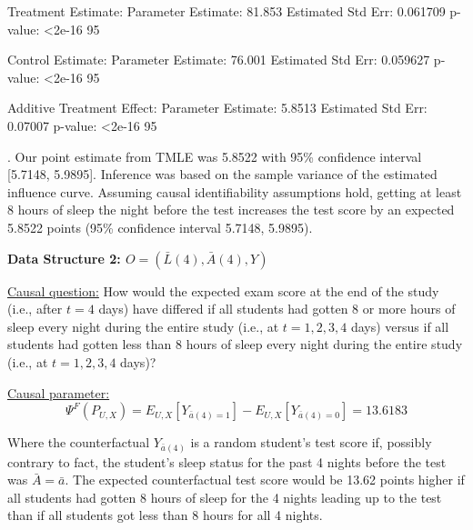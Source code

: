 \documentclass[answers]{exam}
\begin{document}
\begin{solution}
\begin{Schunk}
\begin{Soutput}
Treatment Estimate:
   Parameter Estimate:  81.853 
    Estimated Std Err:  0.061709 
              p-value:  <2e-16 
    95%

Control Estimate:
   Parameter Estimate:  76.001 
    Estimated Std Err:  0.059627 
              p-value:  <2e-16 
    95%

Additive Treatment Effect:
   Parameter Estimate:  5.8513 
    Estimated Std Err:  0.07007 
              p-value:  <2e-16 
    95%
\end{Soutput}
\end{Schunk}

. Our point estimate from TMLE was 5.8522 with 95\% confidence interval [5.7148, 5.9895]. Inference was based on the sample variance of the estimated influence curve. Assuming causal identifiability assumptions hold, getting at least 8 hours of sleep the night before the test increases the test score by an expected 5.8522 points (95\% confidence interval 5.7148, 5.9895).


\end{solution}


\noindent\large\textbf{Data Structure 2: $O = (\bar{L}(4), \bar{A}(4), Y)$}
\normalsize


\noindent\underline{Causal question:} How would the expected exam score at the end of the study (i.e., after $t=4$ days) have differed if all students had gotten 8 or more hours of sleep every night during the entire study (i.e., at $t=1,2,3,4$ days) versus if all students had gotten less than 8 hours of sleep every night during the entire study (i.e., at $t=1,2,3,4$ days)?

\noindent\underline{Causal parameter:}
\[
\Psi^F(P_{U,X}) = E_{U,X}[Y_{\bar{a}(4)=1}] - E_{U,X}[Y_{\bar{a}(4)=0}] = 13.6183
\]

Where the counterfactual $Y_{\bar{a}(4)}$ is a random student's test score if, possibly contrary to fact, the student's sleep status for the past 4 nights before the test was $\bar{A} = \bar{a}$. The expected counterfactual test score would be 13.62 points higher if all students had gotten 8 hours of sleep for the 4 nights leading up to the test than if all students got less than 8 hours for all 4 nights.
\end{document}
